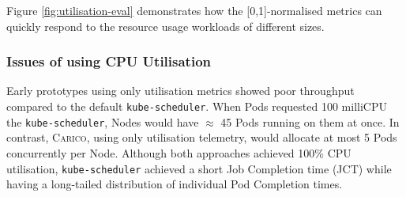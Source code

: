 Figure \ref{fig:utilisation-eval} demonstrates how the [0,1]-normalised
metrics can quickly respond to the resource usage workloads of different sizes.

\subsubsection{Issues of using CPU Utilisation}
\label{sec:issue-with-util}
Early prototypes using only utilisation metrics showed poor throughput compared
to the default \verb|kube-scheduler|. When Pods requested
100 milliCPU the \verb|kube-scheduler|, Nodes would have $\approx$ 45
Pods running on them at once. In contrast, \textsc{Carico}, using only utilisation
telemetry, would allocate at most 5 Pods concurrently per Node. Although both
approaches achieved 100\% CPU utilisation, \verb|kube-scheduler| achieved a
short Job Completion time (JCT) while having a long-tailed distribution of
individual Pod Completion times.

